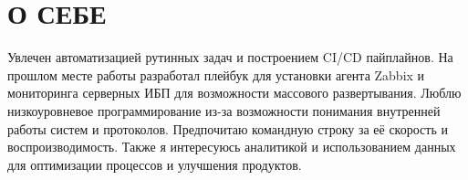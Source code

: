 \section{О СЕБЕ}

Увлечен автоматизацией рутинных задач и построением CI/CD пайплайнов.
На прошлом месте работы разработал плейбук для установки агента Zabbix
и мониторинга серверных ИБП для возможности массового развертывания.
Люблю низкоуровневое программирование из-за возможности понимания
внутренней работы систем и протоколов. Предпочитаю командную строку за
её скорость и воспроизводимость.  Также я интересуюсь аналитикой и
использованием данных для оптимизации процессов и улучшения продуктов.

